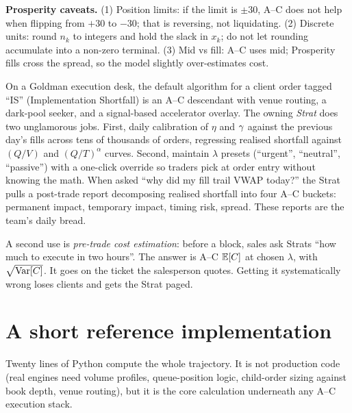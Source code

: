 \begin{prosperitybox}
\textbf{Prosperity caveats.} (1) Position limits: if the limit is
$\pm 30$, A--C does not help when flipping from $+30$ to $-30$;
that is reversing, not liquidating. (2) Discrete units: round
$n_k$ to integers and hold the slack in $x_k$; do not let rounding
accumulate into a non-zero terminal. (3) Mid vs fill: A--C uses
mid; Prosperity fills cross the spread, so the model slightly
over-estimates cost.
\end{prosperitybox}

\begin{gsbox}
On a Goldman execution desk, the default algorithm for a client
order tagged ``IS'' (Implementation Shortfall) is an A--C
descendant with venue routing, a dark-pool seeker, and a
signal-based accelerator overlay. The owning \emph{Strat} does
two unglamorous jobs. First, daily calibration of $\eta$ and
$\gamma$ against the previous day's fills across tens of
thousands of orders, regressing realised shortfall against $(Q/V)$
and $(Q/T)^\alpha$ curves. Second, maintain $\lambda$ presets
(``urgent'', ``neutral'', ``passive'') with a one-click override
so traders pick at order entry without knowing the math. When
asked ``why did my fill trail VWAP today?'' the Strat pulls a
post-trade report decomposing realised shortfall into four
A--C buckets: permanent impact, temporary impact, timing risk,
spread. These reports are the team's daily bread.

A second use is \emph{pre-trade cost estimation}: before a block,
sales ask Strats ``how much to execute in two hours''. The answer
is A--C $\mathbb{E}[C]$ at chosen $\lambda$, with $\sqrt{\operatorname{Var}[C]}$. It
goes on the ticket the salesperson quotes. Getting it
systematically wrong loses clients and gets the Strat paged.
\end{gsbox}

\section{A short reference implementation}
\label{sec:ac_code}

Twenty lines of Python compute the whole trajectory. It is not
production code (real engines need volume profiles, queue-position
logic, child-order sizing against book depth, venue routing), but it
is the core calculation underneath any A--C execution stack.

